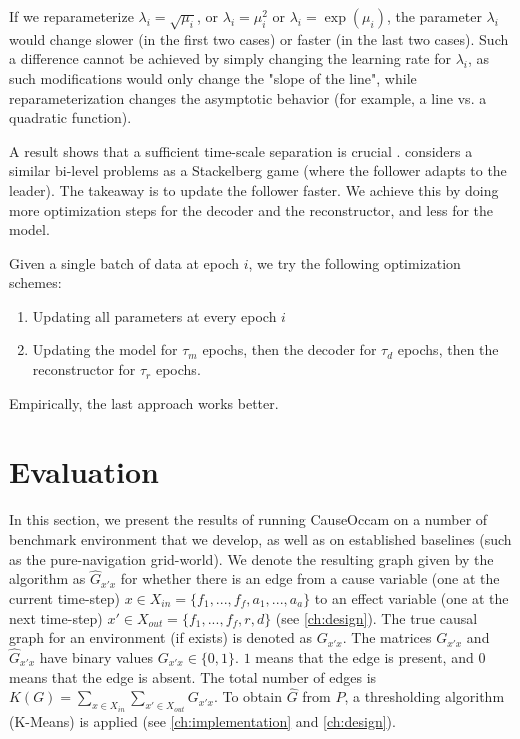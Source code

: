\documentclass[a4paper,11pt,oneside]{report}
\newcommand{\sysname}{CauseOccam\xspace}
\begin{document}
If we reparameterize $\lambda_i=\sqrt{\mu_i}$, or $\lambda_i=\mu_i^2$ or $\lambda_i=\exp(\mu_i)$, the parameter $\lambda_i$ would change slower (in the first two cases) or faster (in the last two cases). Such a difference cannot be achieved by simply changing the learning rate for $\lambda_i$, as such modifications would only change the "slope of the line", while reparameterization changes the asymptotic behavior (for example, a line vs. a quadratic function).

A result shows that a sufficient time-scale separation is crucial \cite{Fiez2020}.
 \cite{Rajeswaran2020} considers a similar bi-level problems as a Stackelberg game (where the follower adapts to the leader). The takeaway is to update the follower faster. We achieve this by doing more optimization steps for the decoder and the reconstructor, and less for the model.

Given a single batch of data at epoch $i$, we try the following optimization schemes:
\begin{enumerate}
    \item Updating all parameters at every epoch $i$
    \item Updating the model for $\tau_m$ epochs, then the decoder for $\tau_d$ epochs, then the reconstructor for $\tau_r$ epochs.
\end{enumerate}

Empirically, the last approach works better.


\chapter{Evaluation}
\label{ch:evaluation}
In this section, we present the results of running \sysname on a number of benchmark environment that we develop, as well as on established baselines (such as the pure-navigation grid-world).
We denote the resulting graph given by the algorithm as $\hat{G}_{x'x}$ for whether there is an edge from a cause variable (one at the current time-step) $x\in X_{in}=\{f_1,...,f_f,a_1,...,a_a\}$ to an effect variable (one at the next time-step) $x'\in X_{out}=\{f_1,...,f_f,r,d\}$ (see \autoref{ch:design}). The true causal graph for an environment (if exists) is denoted as $G_{x'x}$. The matrices $G_{x'x}$ and $\hat{G}_{x'x}$ have binary values $G_{x'x}\in\{0,1\}$. $1$ means that the edge is present, and $0$ means that the edge is absent. The total number of edges is $K(G)=\sum\limits_{x\in X_{in}}\sum\limits_{x'\in X_{out}}G_{x'x}$. To obtain $\hat{G}$ from $P$, a thresholding algorithm (K-Means) is applied (see \autoref{ch:implementation} and \autoref{ch:design}).
\end{document}
